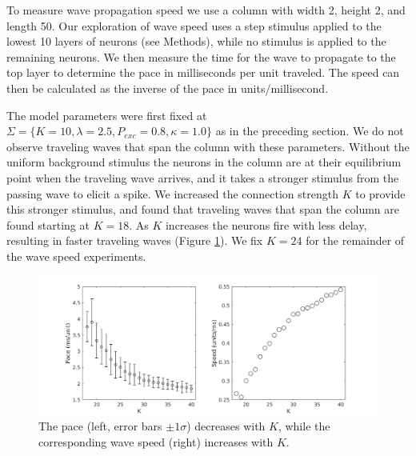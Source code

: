 \documentclass[a4paper,11pt]{article}
\begin{document}
To measure wave propagation speed we use a column with width 2, height 2, and length 50.
Our exploration of wave speed uses a step stimulus applied to the lowest 10 layers of neurons (see Methods), while no stimulus is applied to the remaining neurons.
We then measure the time for the wave to propagate to the top layer to determine the pace in milliseconds per unit traveled.
The speed can then be calculated as the inverse of the pace in units/millisecond.

The model parameters were first fixed at $\Sigma = \{K=10,\lambda=2.5,P_{exc}=0.8,\kappa=1.0 \}$ as in the preceding section.
We do not observe traveling waves that span the column with these parameters.
Without the uniform background stimulus the neurons in the column are at their equilibrium point when the traveling wave arrives, and it takes a stronger stimulus from the passing wave to elicit a spike.
We increased the connection strength $K$ to provide this stronger stimulus, and found that traveling waves that span the column are found starting at $K=18$. 
As $K$ increases the neurons fire with less delay, resulting in faster traveling waves (Figure \ref{fig:delay_k}).
We fix $K=24$ for the remainder of the wave speed experiments.
\begin{figure}[!htb]
 \caption{The pace (left, error bars $\pm 1 \sigma$) decreases with $K$, while the corresponding wave speed (right) increases with $K$. }
 \label{fig:delay_k}
 \centering
   \includegraphics[width=\textwidth]{fig/WaveSpeed_K}
\end{figure}
\end{document}
